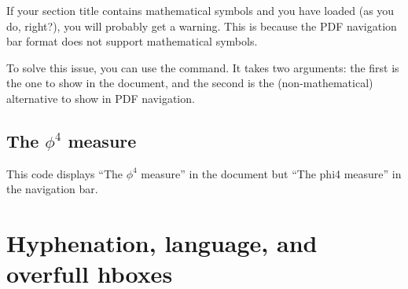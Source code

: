 \begin{gotcha}
If your section title contains mathematical symbols
and you have  loaded (as you do, right?),
you will probably get a warning.
This is because the PDF navigation bar format does not support mathematical symbols.

To solve this issue, you can use the  command.
It takes two arguments: the first is the one to show in the document,
and the second is the (non-mathematical) alternative to show in PDF navigation.
\begin{ExampleCode}
\section{The \texorpdfstring{$\phi^4$}{phi4} measure}
\end{ExampleCode}
This code displays ``The $\phi^4$ measure'' in the document
but ``The phi4 measure'' in the navigation bar.
\end{gotcha}


%
%
%
\section{Hyphenation, language, and overfull hboxes}



